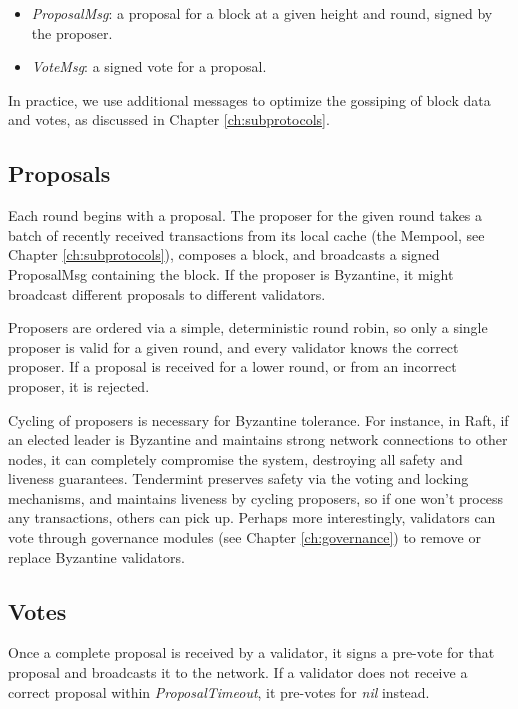 \begin{itemize}
\item{\emph{ProposalMsg}: a proposal for a block at a given height and round, signed by the proposer.}
\item{\emph{VoteMsg}: a signed vote for a proposal.}
\end{itemize}

In practice, we use additional messages to optimize the gossiping of block data and votes, as discussed in Chapter \ref{ch:subprotocols}.

\subsection{Proposals}

Each round begins with a proposal. 
The proposer for the given round takes a batch of recently received transactions from its local cache (the Mempool, see Chapter \ref{ch:subprotocols}),
composes a block, and broadcasts a signed ProposalMsg containing the block.
If the proposer is Byzantine, it might broadcast different proposals to different validators.

Proposers are ordered via a simple, deterministic round robin, 
so only a single proposer is valid for a given round, 
and every validator knows the correct proposer. 
If a proposal is received for a lower round, or from an incorrect proposer, it is rejected.

Cycling of proposers is necessary for Byzantine tolerance. 
For instance, in Raft, if an elected leader is Byzantine and maintains strong network connections to other nodes,
it can completely compromise the system, destroying all safety and liveness guarantees.
Tendermint preserves safety via the voting and locking mechanisms, 
and maintains liveness by cycling proposers, so if one won't process any transactions, others can pick up.
Perhaps more interestingly, validators can vote through governance modules (see Chapter \ref{ch:governance}) to remove or replace Byzantine validators.

\subsection{Votes}

Once a complete proposal is received by a validator, 
it signs a pre-vote for that proposal and broadcasts it to the network.
If a validator does not receive a correct proposal within \emph{ProposalTimeout}, 
it pre-votes for \emph{nil} instead.

